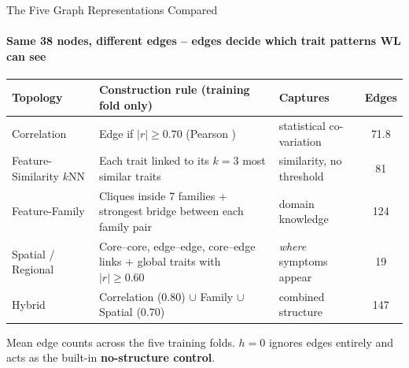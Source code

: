 \documentclass[aspectratio=169, 11pt]{beamer}
\begin{document}
\begin{frame}{The Five Graph Representations Compared}
    \framesubtitle{Same 38 nodes, different edges -- edges decide which trait patterns WL can see}
    \begin{table}
        \centering
        \scriptsize
        \renewcommand{\arraystretch}{1.3}
        \begin{tabular}{L{2.6cm} L{6.4cm} L{3.0cm} c}
            \toprule
            \textbf{Topology} & \textbf{Construction rule (training fold only)} & \textbf{Captures} & \textbf{Edges} \\
            \midrule
            Correlation & Edge if $|r| \ge 0.70$ (Pearson \cite{pearson1895notes}) & statistical co-variation & 71.8 \\
            Feature-Similarity $k$NN & Each trait linked to its $k=3$ most similar traits \cite{cover1967nearest} & similarity, no threshold & 81 \\
            Feature-Family & Cliques inside 7 families + strongest bridge between each family pair & domain knowledge & 124 \\
            Spatial / Regional & Core--core, edge--edge, core--edge links + global traits with $|r| \ge 0.60$ & \emph{where} symptoms appear & 19 \\
            Hybrid & Correlation (0.80) $\cup$ Family $\cup$ Spatial (0.70) & combined structure & 147 \\
            \bottomrule
        \end{tabular}
    \end{table}
    \vspace{0.1cm}
    \centering
    {\scriptsize Mean edge counts across the five training folds. $h = 0$ ignores edges entirely and acts as the built-in \textbf{no-structure control}.}
\end{frame}
\end{document}
